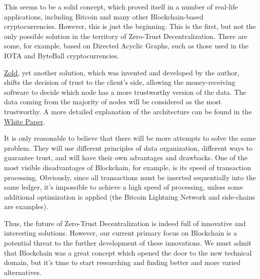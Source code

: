 \documentclass{main}
\begin{document}
This seems to be a solid concept, which proved itself in a number of real-life
applications, including Bitcoin and many other Blockchain-based cryptocurrencies.
However, this is just the beginning. This is the first, but not the only
possible solution in the territory of Zero-Trust Decentralization. There
are some, for example, based on Directed Acyclic Graphs, such as those used in
the IOTA and ByteBall cryptocurrencies.

\href{https://www.zold.io}{Zold}, yet another solution, which was invented and
developed by the author, shifts
the decision of trust to the client's side, allowing the money-receiving
software to decide which node has a more trustworthy version of the data. The data
coming from the majority of nodes will be considered as the most trustworthy.
A more detailed explanation of the architecture can be found in the
\href{https://papers.zold.io/wp.pdf}{White Paper}.

It is only reasonable to believe that there will be more attempts to solve
the same problem. They will use different principles of data organization,
different ways to guarantee trust, and will have their own advantages and drawbacks. One of the
most visible disadvantages of Blockchain, for example, is its speed of transaction processing.
Obviously, since all transactions must be inserted
sequentially into the same ledger, it's impossible to achieve a high speed
of processing, unless some additional optimization is applied
(the Bitcoin Lightning Network and side-chains are examples).

Thus, the future of Zero-Trust Decentralization is indeed full of innovative
and interesting solutions. However, our current primary focus on Blockchain is
a potential threat to the further development of these innovations. We must
admit that Blockchain was a great concept which opened the door to the
new technical domain, but it's time to start researching and finding
better and more varied alternatives.
\end{document}
